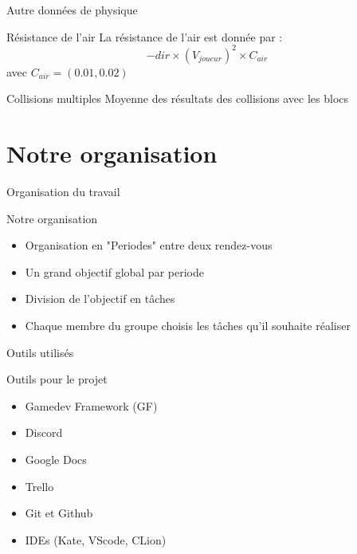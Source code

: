 \documentclass{beamer}
\begin{document}
{\begin{frame}{Autre données de physique}
    \begin{block}{Résistance de l'air}
        La résistance de l'air est donnée par :
        \[
         -dir \times (V_{joueur})^2 \times C_{air}
        \]
        avec \(C_{air} = (0.01,0.02)\)
    \end{block}

    \begin{block}{Collisions multiples}
        Moyenne des résultats des collisions avec les blocs
    \end{block}
\end{frame}

\section{Notre organisation}
\begin{frame}{Organisation du travail}
    \begin{block}{Notre organisation}
        \begin{itemize}
            \item[\bullet] Organisation en "Periodes" entre deux rendez-vous
            \item[\bullet] Un grand objectif global par periode
            \item[\bullet] Division de l'objectif en tâches
            \item[\bullet] Chaque membre du groupe choisis les tâches qu'il souhaite réaliser
        \end{itemize}
    \end{block}
\end{frame}

\begin{frame}{Outils utilisés}
    \begin{block}{Outils pour le projet}
        \begin{itemize}
            \item[\bullet] Gamedev Framework (GF)
            \item[\bullet] Discord
            \item[\bullet] Google Docs
            \item[\bullet] Trello
            \item[\bullet] Git et Github
            \item[\bullet] IDEs (Kate, VScode, CLion)
        \end{itemize}
    \end{block}
\end{frame}

}
\end{document}
